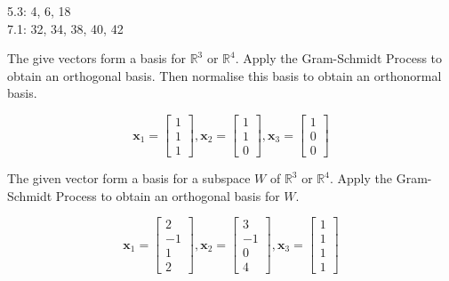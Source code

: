 \documentclass[11pt,letterpaper,boxed]{pset}
\begin{document}
    \begin{center}
    	 5.3: 4, 6, 18 \\
    	 7.1: 32, 34, 38, 40, 42
    \end{center}
    
    \begin{problem} [5.3 \#4]
    	The give vectors form a basis for $\mathbb{R}^3$ or $\mathbb{R}^4$. Apply the Gram-Schmidt Process to obtain an orthogonal basis. Then normalise this basis to obtain an orthonormal basis.
    
    	\[  \textbf{x}_1=\begin{bmatrix} 1 \\ 1 \\ 1 \end{bmatrix},
    		\textbf{x}_2=\begin{bmatrix} 1 \\ 1 \\ 0 \end{bmatrix},
    		\textbf{x}_3=\begin{bmatrix} 1 \\ 0 \\ 0 \end{bmatrix} \]
    
    \end{problem}
    \begin{solution}
    \vspace{\fill}
    \end{solution}
    \clearpage
    
    
    \begin{problem} [5.3 \#6]
    	The given vector form a basis for a subspace $W$ of  $\mathbb{R}^3$ or $\mathbb{R}^4$. Apply the Gram-Schmidt Process to obtain an orthogonal basis for $W$.
    
    	\[  \textbf{x}_1=\begin{bmatrix} 2 \\ -1 \\ 1 \\ 2 \end{bmatrix},
    		\textbf{x}_2=\begin{bmatrix} 3 \\ -1 \\ 0 \\ 4 \end{bmatrix},
    		\textbf{x}_3=\begin{bmatrix} 1 \\ 1 \\ 1 \\ 1 \end{bmatrix}  \]
    
    \end{problem}
    \begin{solution}
    \vspace{\fill}
    \end{solution}
    \clearpage
    
\end{document}
